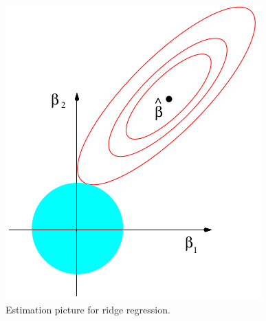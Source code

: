 \begin{figure}[!htbp]
    \centering
    \includegraphics[scale = 0.4]{fig/ridge-reg.png}
    \caption{Estimation picture for ridge regression.}\label{fig:ridge-reg}
\end{figure}